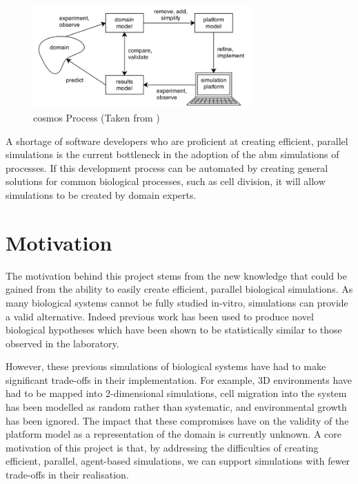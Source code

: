 \documentclass{UoYCSproject}
\begin{document}
\begin{figure}[htp]
\centering
\includegraphics[width=0.75\textwidth]{Appendix/CoSMoS_Process}
\caption{\gls{cosmos} Process (Taken from \cite{mark_read_thesis})}
\label{fig:cosmos_process}
\end{figure}

A shortage of software developers who are proficient at creating efficient, parallel simulations is the current bottleneck in the adoption of the \gls{abm} simulations of processes.
If this development process can be automated by creating general solutions for common biological processes, such as cell division, it will allow simulations to be created by domain experts.


\section{Motivation}
The motivation behind this project stems from the new knowledge that could be gained from the ability to easily create efficient, parallel biological simulations.
As many biological systems cannot be fully studied \gls{in-vitro}, simulations can provide a valid alternative.
Indeed previous work has been used to produce novel biological hypotheses which have been shown to be statistically similar to those observed in the laboratory\cite[p.174]{kieran_thesis}.

However, these previous simulations of biological systems have had to make significant trade-offs in their implementation.
For example, 3D environments have had to be mapped into 2-dimensional simulations, cell migration into the system has been modelled as random rather than systematic\cite{kieran_thesis}, and environmental growth has been ignored\cite{phil_diss}.
The impact that these compromises have on the validity of the platform model as a representation of the domain is currently unknown.
A core motivation of this project is that, by addressing the difficulties of creating efficient, parallel, agent-based simulations, we can support simulations with fewer trade-offs in their realisation.
\end{document}

